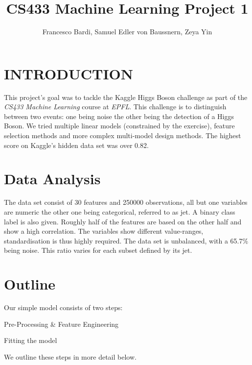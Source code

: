 \documentclass[a4paper, 10pt, conference]{ieeeconf}      %
\title{\LARGE \bf
CS433 Machine Learning Project 1
}
\author{Francesco Bardi, Samuel Edler von Baussnern, Zeya Yin %
}
\begin{document}
\maketitle
\thispagestyle{empty}
\pagestyle{empty}





\section{INTRODUCTION}

This project's goal was to tackle the Kaggle Higgs Boson challenge as part of
the \textit{CS433 Machine Learning} course at \textit{EPFL}. This challenge is 
to distinguish between two events: one being noise the other being the
detection of a Higgs Boson. We tried multiple linear models (constrained
by the exercise), feature selection methods and more complex multi-model design
methods.  The highest score on Kaggle's hidden data set was over 0.82.

\section{Data Analysis}

The data set consist of 30 features and 250000 observations, all but one
variables are numeric the other one being categorical, referred to as jet. A binary class label is
also given. Roughly half of the features are based on the other half and show a
high correlation. The variables show different value-ranges, standardisation is thus highly required.
The data set is unbalanced, with a 65.7\% being noise. This ratio varies for each subset defined by its jet.

\section{Outline}

Our simple model consists of two steps: 

\begin{enumerate*}[label={\alph*)}]
\item Pre-Processing \& Feature Engineering
\item Fitting the model
\end{enumerate*}

We outline these steps in more detail below.\\
\end{document}
